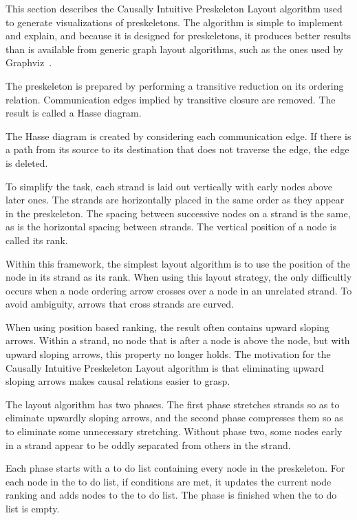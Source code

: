 \documentclass[12pt]{report}
\theoremstyle{definition}
\begin{document}
This section describes the Causally Intuitive Preskeleton Layout
algorithm used to generate visualizations of preskeletons.  The
algorithm is simple to implement and explain, and because it is
designed for preskeletons, it produces better results than is
available from generic graph layout algorithms, such as the ones used
by Graphviz~\cite{GansnerNorth00}.

The preskeleton is prepared by performing a transitive reduction on
its ordering relation.  Communication edges implied by transitive
closure are removed.  The result is called a Hasse diagram.

The Hasse diagram is created by considering each communication edge.
If there is a path from its source to its destination that does not
traverse the edge, the edge is deleted.

To simplify the task, each strand is laid out vertically with early
nodes above later ones.  The strands are horizontally placed in the
same order as they appear in the preskeleton.  The spacing between
successive nodes on a strand is the same, as is the horizontal spacing
between strands.  The vertical position of a node is called its rank.

Within this framework, the simplest layout algorithm is to use the
position of the node in its strand as its rank.  When using this
layout strategy, the only difficultly occurs when a node ordering
arrow crosses over a node in an unrelated strand.  To avoid ambiguity,
arrows that cross strands are curved.

When using position based ranking, the result often contains upward
sloping arrows.  Within a strand, no node that is after a node is
above the node, but with upward sloping arrows, this property no
longer holds.  The motivation for the Causally Intuitive Preskeleton
Layout algorithm is that eliminating upward sloping arrows makes
causal relations easier to grasp.

The layout algorithm has two phases.  The first phase stretches
strands so as to eliminate upwardly sloping arrows, and the second
phase compresses them so as to eliminate some unnecessary stretching.
Without phase two, some nodes early in a strand appear to be oddly
separated from others in the strand.

Each phase starts with a to do list containing every node in the
preskeleton.  For each node in the to do list, if conditions are met,
it updates the current node ranking and adds nodes to the to do list.
The phase is finished when the to do list is empty.
\end{document}
